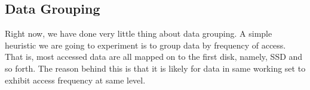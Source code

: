 \subsection{Data Grouping}

Right now, we have done very little thing about data grouping. A
simple heuristic we are going to experiment is to group data by
frequency of access. That is, most accessed data are all mapped on to
the first disk, namely, SSD and so forth. The reason behind this is
that it is likely for data in same working set to exhibit access
frequency at same level. 

